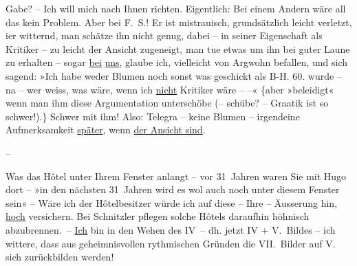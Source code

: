                Gabe? – Ich will mich nach Ihnen richten. Eigentlich: Bei einem Andern wäre all das
               kein Problem. Aber {\pb}bei F. S.! Er ist mistrauisch, grundsätzlich leicht
               verletzt, i{\geminationm}er witternd, man schätze ihn nicht  genug, dabei – in seiner Eigenschaft als Kritiker –
               zu leicht der Ansicht zugeneigt, man tue etwas um ihn bei guter Laune zu erhalten –
               sogar \uline{bei}{ }\uline{uns}, glaube ich, vielleicht von Argwohn befallen, und
               sich sagend: {\pb}»Ich habe weder
               Blumen noch sonst was geschickt als B-H. 60. wurde – na – wer weiss, was wäre, wenn
               ich \uline{nicht} Kritiker wäre – –« {\{}aber »beleidigt« wenn man ihm diese
               Argumentation unterschöbe (– schübe? – Gra{\geminationm}atik ist so
                  schwer!).{\}} Schwer mit ihm! Also: Telegra{\geminationm} – keine Blumen – irgendeine Aufmerksamkeit \uline{später}, wenn {\pb}\uline{\label{T_L02521-1v}\label{T_L02521-1} der Ansicht sind}.\pend
           
\pstart
           \numberlinefalse{}\centering{}–\numberlinetrue{}\pend
           
\pstart
           Was das Hôtel unter Ihrem Fenster anlangt – vor 31 Jahren \introOben{}waren
                  Sie\introOben{} mit Hugo dort – »in den nächsten
               31 Jahren \introOben{}wird es\introOben{} wol auch noch unter diesem Fenster \introOben{}sein\introOben{}« – Wäre ich der Hôtelbesitzer würde ich auf diese – Ihre
               – Äusserung hin, \uline{hoch} versichern. Bei Schnitzler
               pflegen solche Hôtels daraufhin {\pb}höhnisch abzubrennen. – \uline{Ich} bin in den Wehen des
                  IV – dh. jetzt IV + V. Bildes – ich wittere, dass  aus geheimnisvollen rythmischen Gründen die
               VII. Bilder auf V.  sich zurückbilden werden!\pend
           

